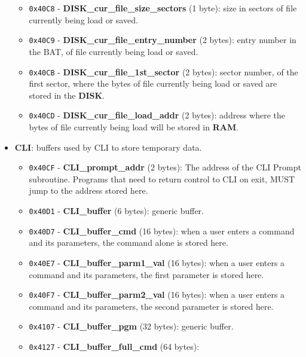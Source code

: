 \begin{itemize}
\begin{itemize}
                \item \texttt{0x40C8} - \textbf{DISK\_cur\_file\_size\_sectors} (1
                byte): size in sectors of file currently being load or saved.
                \item \texttt{0x40C9} - \textbf{DISK\_cur\_file\_entry\_number} (2
                bytes): entry number in the BAT, of file currently being load or
                saved.
                \item \texttt{0x40CB} - \textbf{DISK\_cur\_file\_1st\_sector} (2
                bytes): sector number, of the first sector, where the bytes of file
                currently being load or saved are stored in the \textbf{DISK}.
                \item \texttt{0x40CD} - \textbf{DISK\_cur\_file\_load\_addr} (2
                bytes): address where the bytes of file currently being load will be
                stored in \textbf{RAM}.
            \end{itemize}
            \item \textbf{CLI}: buffers used by CLI to store temporary data.
            \begin{itemize}
                \item \texttt{0x40CF} - \textbf{CLI\_prompt\_addr} (2 bytes): The
                address of the CLI Prompt subroutine. Programs that need to return
                control to CLI on exit, MUST jump to the address stored here.
                \item \texttt{0x40D1} - \textbf{CLI\_buffer} (6 bytes): generic
                buffer.
                \item \texttt{0x40D7} - \textbf{CLI\_buffer\_cmd} (16 bytes): when a
                user enters a command and its parameters, the command alone is
                stored here.
                \item \texttt{0x40E7} - \textbf{CLI\_buffer\_parm1\_val} (16 bytes):
                when a user enters a command and its parameters, the first parameter
                is stored here.
                \item \texttt{0x40F7} - \textbf{CLI\_buffer\_parm2\_val} (16 bytes):
                when a user enters a command and its parameters, the second parameter
                is stored here.
                \item \texttt{0x4107} - \textbf{CLI\_buffer\_pgm} (32 bytes): generic
                buffer.
                \item \texttt{0x4127} - \textbf{CLI\_buffer\_full\_cmd} (64 bytes):

\end{itemize}
\end{itemize}
